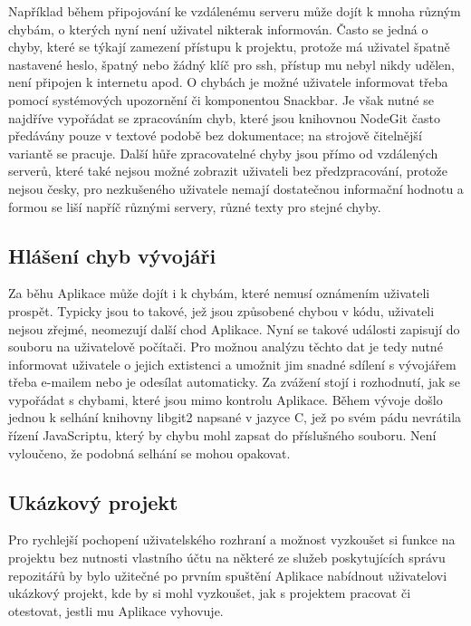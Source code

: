Například během připojování ke vzdálenému serveru může dojít k mnoha různým chybám, o kterých nyní není uživatel nikterak informován. Často se jedná o chyby, které se týkají zamezení přístupu k projektu, protože má uživatel špatně nastavené heslo, špatný nebo žádný klíč pro ssh, přístup mu nebyl nikdy udělen, není připojen k internetu apod. O chybách je možné uživatele informovat třeba pomocí systémových upozornění či komponentou Snackbar. Je však nutné se najdříve vypořádat se zpracováním chyb, které jsou knihovnou NodeGit často předávány pouze v textové podobě bez dokumentace; na strojově čitelnější variantě se pracuje. Další hůře zpracovatelné chyby jsou přímo od vzdálených serverů, které také nejsou možné zobrazit uživateli bez předzpracování, protože nejsou česky, pro nezkušeného uživatele nemají dostatečnou informační hodnotu a formou se liší napříč různými servery, různé texty pro stejné chyby.

\subsection{Hlášení chyb vývojáři}

Za běhu Aplikace může dojít i k chybám, které nemusí oznámením uživateli prospět. Typicky jsou to takové, jež jsou způsobené chybou v kódu, uživateli nejsou zřejmé, neomezují další chod Aplikace. Nyní se takové události zapisují do souboru na uživatelově počítači. Pro možnou analýzu těchto dat je tedy nutné informovat uživatele o jejich extistenci a umožnit jim snadné sdílení s vývojářem třeba e-mailem nebo je odesílat automaticky. Za zvážení stojí i rozhodnutí, jak se vypořádat s chybami, které jsou mimo kontrolu Aplikace. Během vývoje došlo jednou k selhání knihovny libgit2 napsané v jazyce C, jež po svém pádu nevrátila řízení JavaScriptu, který by chybu mohl zapsat do příslušného souboru. Není vyloučeno, že podobná selhání se mohou opakovat.

\subsection{Ukázkový projekt}

Pro rychlejší pochopení uživatelského rozhraní a možnost vyzkoušet si funkce na projektu bez nutnosti vlastního účtu na některé ze služeb poskytujících správu repozitářů by bylo užitečné po prvním spuštění Aplikace nabídnout uživatelovi ukázkový projekt, kde by si mohl vyzkoušet, jak s projektem pracovat či otestovat, jestli mu Aplikace vyhovuje.


